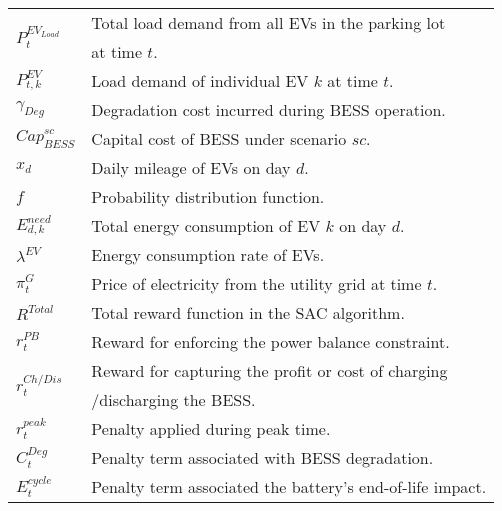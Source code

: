 \documentclass[10pt, journal]{IEEEtran}
\begin{document}
{\small
\setlength{\tabcolsep}{2pt}
\renewcommand{\arraystretch}{1.3}
\begin{center}
\centering
\begin{tabular*}{\columnwidth}{l @{\extracolsep{\fill}} l}
\multirow{2}{*}{\(P_t^{EV_{Load}}\)} & Total load demand from all EVs in the parking lot \\
 & at time \(t\). \\
\(P_{t,k}^{EV}\) & Load demand of individual EV \(k\) at time \(t\). \\
\(\gamma_{Deg}\) & Degradation cost incurred during BESS operation. \\ 
\({Cap}_{BESS}^{sc}\) & Capital cost of BESS under scenario \(sc\). \\ 
\(x_{d}\) & Daily mileage of EVs on day \(d\). \\
\(f\) & Probability distribution function. \\
\(E_{d,k}^{need}\) & Total energy consumption of EV \(k\) on day \(d\). \\
\(\lambda^{EV}\) & Energy consumption rate of EVs. \\
\(\pi^G_t\) & Price of electricity from the utility grid at time \(t\). \\
\(R^{Total}\) & Total reward function in the SAC algorithm. \\
\(r_t^{PB}\) & Reward for enforcing the power balance constraint. \\
\multirow{2}{*}{\(r_t^{Ch/Dis}\)} & Reward for capturing the profit or cost of charging \\
 & /discharging the BESS. \\
\(r_t^{peak}\) & Penalty applied during peak time. \\
\(C_t^{Deg}\) & Penalty term associated with BESS degradation. \\
\(E_t^{cycle}\) & Penalty term associated the battery's end-of-life impact. \\
\end{tabular*}
\end{center}}
\end{document}
